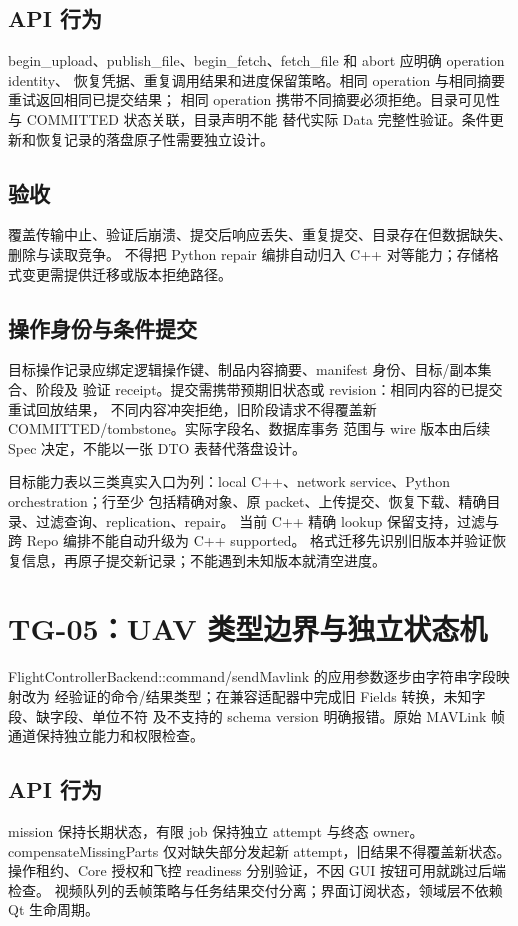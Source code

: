 \subsection{API 行为}
begin\_upload、publish\_file、begin\_fetch、fetch\_file 和 abort 应明确 operation identity、
恢复凭据、重复调用结果和进度保留策略。相同 operation 与相同摘要重试返回相同已提交结果；
相同 operation 携带不同摘要必须拒绝。目录可见性与 COMMITTED 状态关联，目录声明不能
替代实际 Data 完整性验证。条件更新和恢复记录的落盘原子性需要独立设计。

\subsection{验收}
覆盖传输中止、验证后崩溃、提交后响应丢失、重复提交、目录存在但数据缺失、删除与读取竞争。
不得把 Python repair 编排自动归入 C++ 对等能力；存储格式变更需提供迁移或版本拒绝路径。

\subsection{操作身份与条件提交}
目标操作记录应绑定逻辑操作键、制品内容摘要、manifest 身份、目标/副本集合、阶段及
验证 receipt。提交需携带预期旧状态或 revision：相同内容的已提交重试回放结果，
不同内容冲突拒绝，旧阶段请求不得覆盖新 COMMITTED/tombstone。实际字段名、数据库事务
范围与 wire 版本由后续 Spec 决定，不能以一张 DTO 表替代落盘设计。

目标能力表以三类真实入口为列：local C++、network service、Python orchestration；行至少
包括精确对象、原 packet、上传提交、恢复下载、精确目录、过滤查询、replication、repair。
当前 C++ 精确 lookup 保留支持，过滤与跨 Repo 编排不能自动升级为 C++ supported。
格式迁移先识别旧版本并验证恢复信息，再原子提交新记录；不能遇到未知版本就清空进度。

\section{TG-05：UAV 类型边界与独立状态机}
FlightControllerBackend::command/sendMavlink 的应用参数逐步由字符串字段映射改为
经验证的命令/结果类型；在兼容适配器中完成旧 Fields 转换，未知字段、缺字段、单位不符
及不支持的 schema version 明确报错。原始 MAVLink 帧通道保持独立能力和权限检查。

\subsection{API 行为}
mission 保持长期状态，有限 job 保持独立 attempt 与终态 owner。
compensateMissingParts 仅对缺失部分发起新 attempt，旧结果不得覆盖新状态。
操作租约、Core 授权和飞控 readiness 分别验证，不因 GUI 按钮可用就跳过后端检查。
视频队列的丢帧策略与任务结果交付分离；界面订阅状态，领域层不依赖 Qt 生命周期。

